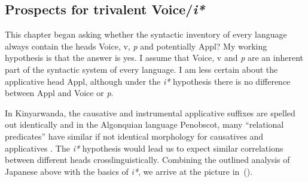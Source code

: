 	\subsection{Prospects for trivalent Voice/\textit{i*}} \label{i:i:ay}
This chapter began asking whether the syntactic inventory of every language always contain the heads Voice, v, \textit{p} and potentially Appl? My working hypothesis is that the answer is yes. I assume that Voice, v and \emph{p} are an inherent part of the syntactic system of every language. I am less certain about the applicative head Appl, although under the \textit{i*} hypothesis there is no difference between Appl and Voice or \textit{p}. 

In Kinyarwanda, the causative and instrumental applicative suffixes are spelled out identically \citep{jerro17} and in the Algonquian language Penobscot, many ``relational predicates'' have similar if not identical morphology for causatives and applicatives \citep[Ch.~2.3.7.1]{quinn06phd}. The \emph{i*} hypothesis would lead us to expect similar correlations between different heads crosslinguistically. Combining the outlined analysis of Japanese above with the basics of \emph{i*}, we arrive at the picture in~(\nextx).



